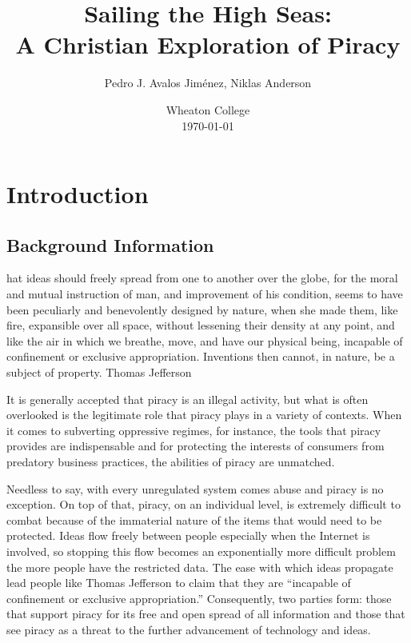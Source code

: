 \documentclass[onecolumn, 12pt]{article}
\title{Sailing the High Seas:\\ A Christian Exploration of Piracy}
\author{Pedro J. Avalos Jim\'enez, Niklas Anderson}
\date{Wheaton College\\\today}
\begin{document}
\maketitle

\section{Introduction}

\subsection{Background Information}

\begin{displayquote}
  hat ideas should freely spread from one to another over the globe,
  for the moral and mutual instruction of man, and improvement of his
  condition, seems to have been peculiarly and benevolently designed by nature,
  when she made them, like fire, expansible over all space, without lessening
  their density at any point, and like the air in which we breathe, move, and
  have our physical being, incapable of confinement or exclusive appropriation.
  Inventions then cannot, in nature, be a subject of property.
  Thomas Jefferson~\cite{barlow:wine}
\end{displayquote}
It is generally accepted that piracy is an illegal activity, but what is often overlooked
is the legitimate role that piracy plays in a variety of contexts. When it comes to
subverting oppressive regimes, for instance, the tools that piracy provides are
indispensable and for protecting the interests of consumers from predatory business
practices, the abilities of piracy are unmatched. 

Needless to say, with every unregulated system comes abuse and piracy is no exception.
On top of that, piracy, on an individual level, is extremely difficult to combat because
of the immaterial nature of the items that would need to be protected. Ideas flow freely
between people especially when the Internet is involved, so stopping this flow becomes an
exponentially more difficult problem the more people have the restricted data. The ease
with which ideas propagate lead people like Thomas Jefferson to claim that they are
``incapable of confinement or exclusive appropriation.'' Consequently, two parties form:
those that support piracy for its free and open spread of all information and those that
see piracy as a threat to the further advancement of technology and ideas.
\end{document}
